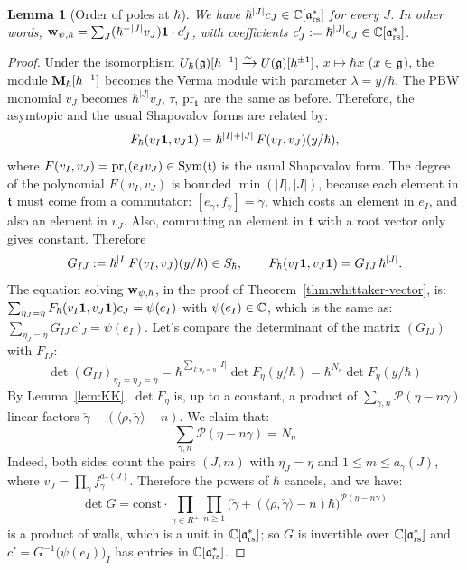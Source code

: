 \documentclass{article}
\theoremstyle{plain}
\newtheorem{lemma}[theorem]{Lemma}
\theoremstyle{definition}
\theoremstyle{remark}
\numberwithin{equation}{section}
\begin{document}
\begin{lemma}[Order of poles at $\hbar$]\label{lem:integrality} We have 
$\hbar^{|J|}c_J\in\mathbb{C}[\mathfrak{a}^*_{\mathrm{rs}}]$ for every $J$. In other words, $\mathbf w_{\psi,\hbar}=\sum_J(\hbar^{-|J|}v_J)\mathbf 1\cdot c'_J$, with coefficients  $c'_J:=\hbar^{|J|}c_J\in\mathbb{C}[\mathfrak{a}^*_{\mathrm{rs}}]$.
\end{lemma}

\begin{proof}
Under the isomorphism $U_\hbar(\mathfrak{g})[\hbar^{-1}]\xrightarrow{\sim}U(\mathfrak{g})[\hbar^{\pm1}]$, $x\mapsto\hbar x$ ($x\in\mathfrak{g}$), the module $\mathbf{M}_\hbar[\hbar^{-1}]$ becomes the Verma module with parameter $\lambda=y/\hbar$. The PBW monomial $v_J$ becomes $\hbar^{|J|}v_J$,  $\tau$, $\mathrm{pr}_{\mathfrak{t}}$ are the same as before. Therefore, the asymtopic and the usual Shapovalov forms are related by:
\[
F_\hbar(v_I\mathbf 1,v_J\mathbf 1)=\hbar^{|I|+|J|}\,F(v_I,v_J)(y/\hbar),
\]
where $F(v_I,v_J)=\mathrm{pr}_{\mathfrak{t}}(e_Iv_J)\in\operatorname{Sym}(\mathfrak{t})$ is the usual Shapovalov form. The degree of the polynomial $F(v_I,v_J)$ is bounded $\min(|I|,|J|)$, because each element in $\mathfrak{t}$ must come from a commutator: $[e_\gamma,f_\gamma]=\check\gamma$, which costs an element in $e_I$, and also an element in $v_J$. Also, commuting an element in $\mathfrak{t}$ with a root vector only gives constant. Therefore
\[
G_{IJ}:=\hbar^{|I|}F(v_I,v_J)(y/\hbar)\in S_\hbar,\qquad F_\hbar(v_I\mathbf 1,v_J\mathbf 1)=G_{IJ}\,\hbar^{|J|}.
\]
The equation solving $\mathbf w_{\psi,\hbar}$, in the proof of Theorem~\ref{thm:whittaker-vector}, is:  $\sum_{\eta_J=\eta}F_\hbar(v_I\mathbf 1,v_J\mathbf 1)c_J=\psi(e_I)$ with $\psi(e_I)\in\mathbb{C}$, which is the same as:  $\sum_{\eta_J=\eta}G_{IJ}\,c'_J=\psi(e_I)$. Let's compare the determinant of the matrix $(G_{IJ})$ with $F_{IJ}$: 
\begin{equation*}
    \det(G_{IJ})_{\eta_I=\eta_J=\eta}= \hbar^{\sum_{I: \eta_I = \eta} |I|}\det F_\eta(y/\hbar)= 
    \hbar^{N_\eta}\det F_\eta(y/\hbar)
\end{equation*}
By Lemma~\ref{lem:KK}, $\det F_\eta$ is, up to a constant, a product of $\sum_{\gamma,n}\mathscr P(\eta-n\gamma)$ linear factors $\check{\gamma} + (\langle\rho,\check\gamma\rangle-n)$. We claim that:
\begin{equation*}
    \sum_{\gamma,n}\mathscr P(\eta-n\gamma) = N_\eta
\end{equation*}
Indeed, both sides count the pairs $(J,m)$ with $\eta_J=\eta$ and $1\le m\le a_\gamma(J)$, where $v_J=\prod_\gamma f_\gamma^{a_\gamma(J)}$. Therefore the powers of $\hbar$ cancels, and we have:
\[
\det G=\mathrm{const}\cdot\prod_{\gamma\in R^+}\prod_{n\ge1}\bigl(\check\gamma+(\langle\rho,\check\gamma\rangle-n)\hbar\bigr)^{\mathscr P(\eta-n\gamma)}
\]
is a product of walls, which is a unit in $\mathbb{C}[\mathfrak{a}^*_{\mathrm{rs}}]$; so $G$ is invertible over $\mathbb{C}[\mathfrak{a}^*_{\mathrm{rs}}]$ and $c'=G^{-1}\bigl(\psi(e_I)\bigr)_I$ has entries in $\mathbb{C}[\mathfrak{a}^*_{\mathrm{rs}}]$. 
\end{proof}
\end{document}
